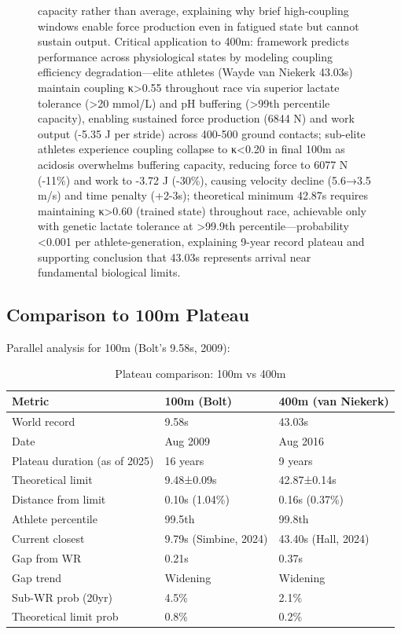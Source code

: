 \begin{figure}[htbp]
{capacity rather than average, explaining why brief high-coupling windows enable force production even in fatigued state but cannot sustain output. Critical application to 400m: framework predicts performance across physiological states by modeling coupling efficiency degradation—elite athletes (Wayde van Niekerk 43.03s) maintain coupling κ>0.55 throughout race via superior lactate tolerance (>20 mmol/L) and pH buffering (>99th percentile capacity), enabling sustained force production (6844 N) and work output (-5.35 J per stride) across 400-500 ground contacts; sub-elite athletes experience coupling collapse to κ<0.20 in final 100m as acidosis overwhelms buffering capacity, reducing force to 6077 N (-11\%) and work to -3.72 J (-30\%), causing velocity decline (5.6→3.5 m/s) and time penalty (+2-3s); theoretical minimum 42.87s requires maintaining κ>0.60 (trained state) throughout race, achievable only with genetic lactate tolerance at >99.9th percentile—probability <0.001 per athlete-generation, explaining 9-year record plateau and supporting conclusion that 43.03s represents arrival near fundamental biological limits.}
\label{fig:performance_prediction}
\end{figure}


\subsection{Comparison to 100m Plateau}

Parallel analysis for 100m (Bolt's 9.58s, 2009):

\begin{table}[H]
\centering
\caption{Plateau comparison: 100m vs 400m}
\begin{tabular}{@{}lll@{}}
\toprule
\textbf{Metric} & \textbf{100m (Bolt)} & \textbf{400m (van Niekerk)} \\
\midrule
World record & 9.58s & 43.03s \\
Date & Aug 2009 & Aug 2016 \\
Plateau duration (as of 2025) & 16 years & 9 years \\
\midrule
Theoretical limit & 9.48±0.09s & 42.87±0.14s \\
Distance from limit & 0.10s (1.04\%) & 0.16s (0.37\%) \\
Athlete percentile & 99.5th & 99.8th \\
\midrule
Current closest & 9.79s (Simbine, 2024) & 43.40s (Hall, 2024) \\
Gap from WR & 0.21s & 0.37s \\
Gap trend & Widening & Widening \\
\midrule
Sub-WR prob (20yr) & 4.5\% & 2.1\% \\
Theoretical limit prob & 0.8\% & 0.2\% \\
\bottomrule
\end{tabular}
\end{table}

